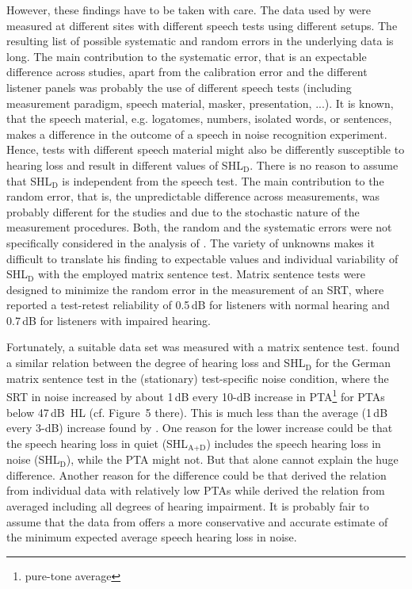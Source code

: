 \documentclass[10pt,a4paper,twocolumn]{article}
\begin{document}
However, these findings have to be taken with care.
%
The data used by \cite{plomp1978} were measured at different sites with different speech tests using different setups.
%
The resulting list of possible systematic and random errors in the underlying data is long.
%
The main contribution to the systematic error, that is an expectable difference across studies, apart from the calibration error and the different listener panels was probably the use of different speech tests (including measurement paradigm, speech material, masker, presentation, ...).
%
It is known, that the speech material, e.g. logatomes, numbers, isolated words, or sentences, makes a difference in the outcome of a speech in noise recognition experiment.
%
Hence, tests with different speech material might also be differently susceptible to hearing loss and result in different values of SHL$_\text{D}$.
%
There is no reason to assume that SHL$_\text{D}$ is independent from the speech test.
%
The main contribution to the random error, that is, the unpredictable difference across measurements, was probably different for the studies and due to the stochastic nature of the measurement procedures.
%
Both, the random and the systematic errors were not specifically considered in the analysis of \cite{plomp1978}.
%
The variety of unknowns makes it difficult to translate his finding to expectable values and individual variability of SHL$_\text{D}$ with the employed matrix sentence test.
%
Matrix sentence tests were designed to minimize the random error in the measurement of an SRT, where \cite{kollmeier2015} reported a test-retest reliability of 0.5\,dB for listeners with normal hearing and 0.7\,dB for listeners with impaired hearing.

Fortunately, a suitable data set was measured with a matrix sentence test.
%
\cite{wardenga2015} found a similar relation between the degree of hearing loss and SHL$_\text{D}$ for the German matrix sentence test in the (stationary) test-specific noise condition, where the SRT in noise increased by about 1\,dB every 10-dB increase in PTA\footnote{pure-tone average} for PTAs below 47\,dB~HL (cf. Figure~5 there).
%
This is much less than the average (1\,dB every 3-dB) increase found by \cite{plomp1978}.
%
One reason for the lower increase could be that the speech hearing loss in quiet (SHL$_\text{A+D}$) includes the speech hearing loss in noise (SHL$_\text{D}$), while the PTA might not.
%
But that alone cannot explain the huge difference.
%
Another reason for the difference could be that \cite{wardenga2015} derived the relation from individual data with relatively low PTAs while \cite{plomp1978} derived the relation from averaged including all degrees of hearing impairment.
%
It is probably fair to assume that the data from \cite{wardenga2015} offers a more conservative and accurate estimate of the minimum expected average speech hearing loss in noise.
\end{document}
